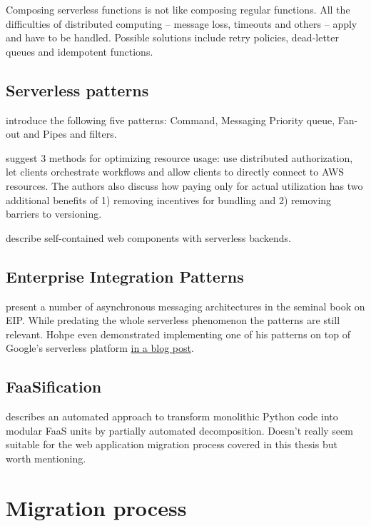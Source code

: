 \documentclass[utf8,english]{gradu3}
\begin{document}
Composing serverless functions is not like composing regular functions. All the difficulties of distributed computing -- message loss, timeouts and others -- apply and have to be handled. Possible solutions include retry policies, dead-letter queues and idempotent functions.

\section{Serverless patterns}

\textcite{sbarski2017serverless} introduce the following five patterns: Command, Messaging Priority queue, Fan-out and Pipes and filters.

\textcite{adzic2017serverless} suggest 3 methods for optimizing resource usage: use distributed authorization, let clients orchestrate workflows and allow clients to directly connect to AWS resources. The authors also discuss how paying only for actual utilization has two additional benefits of 1) removing incentives for bundling and 2) removing barriers to versioning.

\textcite{ast17webcomponent} describe self-contained web components with serverless backends.

\section{Enterprise Integration Patterns}

\textcite{hohpe2004enterprise} present a number of asynchronous messaging architectures in the seminal book on EIP. While predating the whole serverless phenomenon the patterns are still relevant. Hohpe even demonstrated implementing one of his patterns on top of Google's serverless platform \href{http://www.enterpriseintegrationpatterns.com/ramblings/google_cloud_functions.html}{in a blog post}.

\section{FaaSification}

\textcite{spillner17transformpython} describes an automated approach to transform monolithic Python code into modular FaaS units by partially automated decomposition. Doesn't really seem suitable for the web application migration process covered in this thesis but worth mentioning.

\chapter{Migration process}
\end{document}
